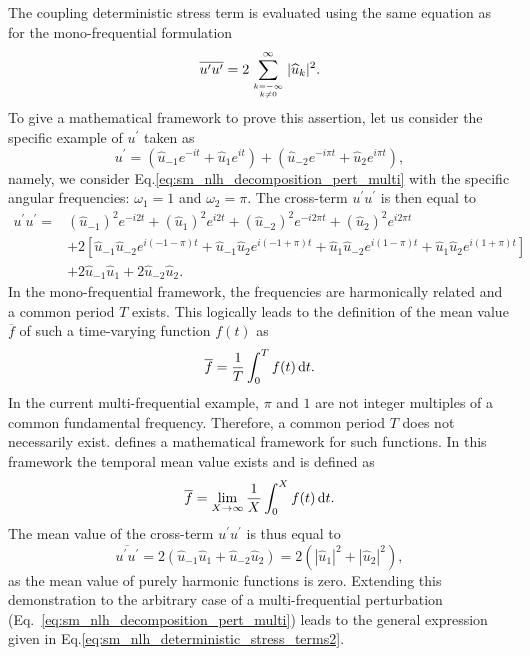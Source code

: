 The coupling deterministic stress term is evaluated using the
same equation as for the mono-frequential formulation
\begin{equation}
	\overline{u^\prime u^\prime} = 
	2 \sum_{\genfrac{}{}{0pt}{}{k=-\infty}{k \neq 0}}^{\infty} |\widehat{u}_k|^2.
	\label{eq:sm_nlh_deterministic_stress_terms2}
\end{equation}
To give a mathematical framework to prove this assertion, 
let us consider the specific example of $u^\prime$ taken as
\begin{equation}
	u^\prime = (\widehat{u}_{-1} e^{-i t} + \widehat{u}_{1} e^{i t}) +
		(\widehat{u}_{-2} e^{-i \pi t} + \widehat{u}_{2} e^{i \pi t}),
\end{equation}
namely, we consider Eq.\eqref{eq:sm_nlh_decomposition_pert_multi}
with the specific angular frequencies: $\omega_1 = 1$ and $\omega_2 = \pi$.
The cross-term $u^\prime u^\prime$ is then equal to
\begin{equation}
	\begin{split}
		u^\prime u^\prime = 
			&(\widehat{u}_{-1})^2 e^{-i 2 t}
			+ (\widehat{u}_{1})^2 e^{i 2 t}
			+ (\widehat{u}_{-2})^2 e^{- i 2 \pi t}
			+ (\widehat{u}_{2})^2 e^{i 2 \pi t} \\
		&+ 2 \left[
				\widehat{u}_{-1} \widehat{u}_{-2} e^{i (-1 -\pi) t} 
				+ \widehat{u}_{-1} \widehat{u}_{2} e^{i (-1 + \pi) t}
				+ \widehat{u}_{1} \widehat{u}_{-2} e^{i (1 - \pi) t} 
				+ \widehat{u}_{1} \widehat{u}_{2} e^{i (1 + \pi) t} 
			 \right] \\
		&+ 2 \widehat{u}_{-1}\widehat{u}_{1}
			 	+ 2 \widehat{u}_{-2}\widehat{u}_{2}.
	\end{split}
\end{equation}
In the mono-frequential framework, the frequencies are harmonically related
and a common period $T$ exists. This logically leads to the definition
of the mean value $\overline{f}$ of such a time-varying function $f(t)$ as
\begin{equation}
	\overline{f} = \frac{1}{T} \int_0^T f(t) \mathop{}\!\mathrm{d} t.
\end{equation}
In the current multi-frequential example, 
$\pi$ and $1$ are not integer multiples of a common fundamental
frequency. Therefore, a common period $T$ does
not necessarily exist. \citet{Besicovitch1932}
defines a mathematical framework for such functions. In this framework
the temporal mean value exists and is defined as
\begin{equation}
	\overline{f} = \lim_{X \to \infty} \frac{1}{X} \int_0^X f(t) \mathop{}\!\mathrm{d} t.
\end{equation}
The mean value of the cross-term $u^\prime u^\prime$ is thus equal to
\begin{equation}
	\overline{u^\prime u^\prime} = 2 (\widehat{u}_{-1}\widehat{u}_{1} + 
		\widehat{u}_{-2}\widehat{u}_{2}) = 2 (|\widehat{u}_1|^2 + |\widehat{u}_2|^2),
\end{equation}
as the mean value of purely harmonic functions is zero.
Extending this demonstration to the arbitrary case of a
multi-frequential perturbation 
(Eq.~\eqref{eq:sm_nlh_decomposition_pert_multi}) leads to
the general expression given in Eq.\eqref{eq:sm_nlh_deterministic_stress_terms2}.


